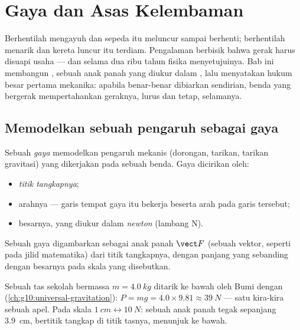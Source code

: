 \chapter{Gaya dan Asas Kelembaman}\label{ch:g10:inertia}

Berhentilah mengayuh dan sepeda itu meluncur sampai berhenti;
berhentilah menarik dan kereta luncur itu terdiam. Pengalaman berbisik
bahwa gerak harus disuapi usaha --- dan selama dua ribu tahun fisika
menyetujuinya. Bab ini membangun , sebuah anak panah yang diukur
dalam , lalu menyatakan hukum besar pertama mekanika: apabila
benar-benar dibiarkan sendirian, benda yang bergerak mempertahankan
geraknya, lurus dan tetap, selamanya.

\section{Memodelkan sebuah pengaruh sebagai gaya}

\begin{definition}[Gaya]\label{def:g10:inertia:force}
Sebuah \emph{gaya} memodelkan pengaruh mekanis (dorongan,
tarikan, tarikan gravitasi) yang dikerjakan pada sebuah benda. Gaya
dicirikan oleh:
\begin{itemize}
  \item \emph{titik tangkapnya};
  \item arahnya --- garis tempat gaya itu bekerja beserta arah pada
        garis tersebut;
  \item besarnya, yang diukur dalam \emph{newton}
        (lambang \unit{N}).
\end{itemize}
Sebuah gaya digambarkan sebagai anak panah $\vect F$ (sebuah vektor,
seperti pada jilid matematika) dari titik tangkapnya, dengan panjang
yang sebanding dengan besarnya pada skala yang disebutkan.
\end{definition}

\begin{example}\label{ex:g10:inertia:schoolbag}
Sebuah tas sekolah bermassa $m = \qty{4.0}{kg}$ ditarik ke bawah oleh
Bumi dengan  (\cref{ch:g10:universal-gravitation}):
$P = mg = 4.0 \times 9.81 \approx \qty{39}{N}$ --- satu  kira-kira
 sebuah apel. Pada skala $\qty{1}{cm} \leftrightarrow
\qty{10}{N}$: sebuah anak panah tegak sepanjang \qty{3.9}{cm}, bertitik
tangkap di titik  tasnya, menunjuk ke bawah.
\end{example}

